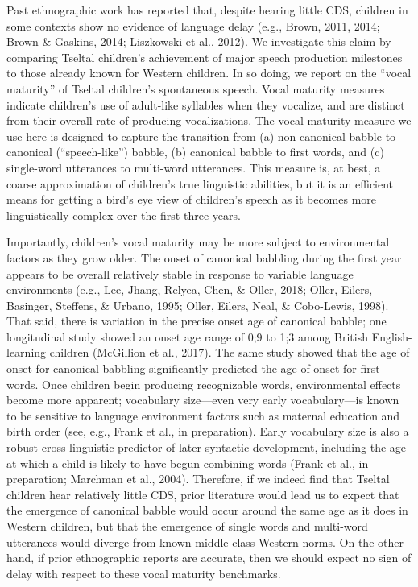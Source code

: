 \documentclass[,man,floatsintext]{apa6}
\begin{document}
Past ethnographic work has reported that, despite hearing little CDS,
children in some contexts show no evidence of language delay (e.g.,
Brown, 2011, 2014; Brown \& Gaskins, 2014; Liszkowski et al., 2012). We
investigate this claim by comparing Tseltal children's achievement of
major speech production milestones to those already known for Western
children. In so doing, we report on the \enquote{vocal maturity} of
Tseltal children's spontaneous speech. Vocal maturity measures indicate
children's use of adult-like syllables when they vocalize, and are
distinct from their overall rate of producing vocalizations. The vocal
maturity measure we use here is designed to capture the transition from
(a) non-canonical babble to canonical (\enquote{speech-like}) babble,
(b) canonical babble to first words, and (c) single-word utterances to
multi-word utterances. This measure is, at best, a coarse approximation
of children's true linguistic abilities, but it is an efficient means
for getting a bird's eye view of children's speech as it becomes more
linguistically complex over the first three years.

Importantly, children's vocal maturity may be more subject to
environmental factors as they grow older. The onset of canonical
babbling during the first year appears to be overall relatively stable
in response to variable language environments (e.g., Lee, Jhang, Relyea,
Chen, \& Oller, 2018; Oller, Eilers, Basinger, Steffens, \& Urbano,
1995; Oller, Eilers, Neal, \& Cobo-Lewis, 1998). That said, there is
variation in the precise onset age of canonical babble; one longitudinal
study showed an onset age range of 0;9 to 1;3 among British
English-learning children (McGillion et al., 2017). The same study
showed that the age of onset for canonical babbling significantly
predicted the age of onset for first words. Once children begin
producing recognizable words, environmental effects become more
apparent; vocabulary size---even very early vocabulary---is known to be
sensitive to language environment factors such as maternal education and
birth order (see, e.g., Frank et al., in preparation). Early vocabulary
size is also a robust cross-linguistic predictor of later syntactic
development, including the age at which a child is likely to have begun
combining words (Frank et al., in preparation; Marchman et al., 2004).
Therefore, if we indeed find that Tseltal children hear relatively
little CDS, prior literature would lead us to expect that the emergence
of canonical babble would occur around the same age as it does in
Western children, but that the emergence of single words and multi-word
utterances would diverge from known middle-class Western norms. On the
other hand, if prior ethnographic reports are accurate, then we should
expect no sign of delay with respect to these vocal maturity benchmarks.
\end{document}
